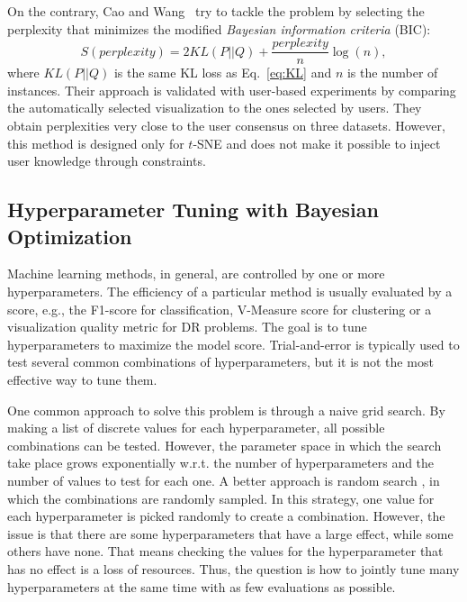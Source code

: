 On the contrary, Cao and Wang~\cite{cao2017automatic} try to tackle the problem by selecting the perplexity that minimizes the modified \emph{Bayesian information criteria} (BIC):
\begin{equation}
S(\textit{perplexity}) = 2KL(P||Q) + \frac{\textit{perplexity}}{n}\log(n),
\end{equation}
where $KL(P||Q)$ is the same KL loss as Eq.~\ref{eq:KL} and $n$ is the number of instances.
Their approach is validated with user-based experiments by comparing the automatically selected visualization to the ones selected by users. They obtain perplexities very close to the user consensus on three datasets. However, this method is designed only for $t$-SNE and does not make it possible to inject user knowledge through constraints.


\subsection{Hyperparameter Tuning with Bayesian Optimization}\label{subsec:tune_with_BayOpt}


Machine learning methods, in general, are controlled by one or more hyperparameters.
The efficiency of a particular method is usually evaluated by a score, e.g., the F1-score for classification, V-Measure score for clustering or a visualization quality metric for DR problems.
The goal is to tune hyperparameters to
maximize the model score.
Trial-and-error is typically used to test several common combinations of hyperparameters,
but it is not the most effective way to tune them.

One common approach to solve this problem is through a naive grid search.
By making a list of discrete values for each hyperparameter,
all possible combinations can be tested.
However, the parameter space in which the search take place grows exponentially w.r.t. the number of hyperparameters
and the number of values to test for each one.
A better approach is random search \cite{bergstra2011algorithms}, in which the combinations are randomly sampled.
In this strategy, one value for each hyperparameter is picked randomly to create a combination.
However, the issue is that there are some hyperparameters that have a large effect, while some others have none.
That means checking the values for the hyperparameter that has no effect is a loss of resources.
Thus, the question is how to jointly tune many hyperparameters at the same time with as few evaluations as possible.

